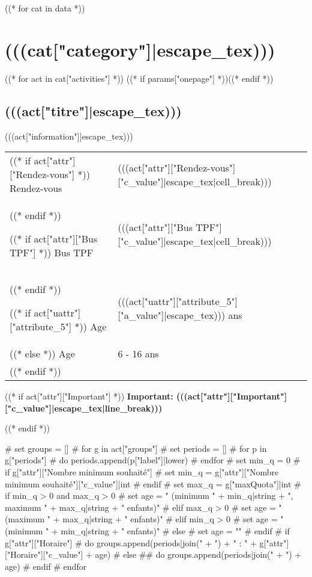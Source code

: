 ((* for cat in data *))
\chapter{(((cat["category"]|escape_tex)))}

((* for act in cat["activities"] *))
((* if params["onepage"] *))\newpage((* endif *))
\begin{minipage}[t]{\textwidth}%
\section{(((act["titre"]|escape_tex)))}

(((act["information"]|escape_tex)))
\medskip

\begin{tabulary}{0.9\textwidth}{p{2.5cm}|L}

((* if act["attr"]["Rendez-vous"] *))
Rendez-vous & (((act["attr"]["Rendez-vous"]["c_value"]|escape_tex|cell_break))) \\
((* endif *))

((* if act["attr"]["Bus TPF"] *))
Bus TPF & (((act["attr"]["Bus TPF"]["c_value"]|escape_tex|cell_break))) \\
((* endif *))

((* if act["uattr"]["attribute_5"] *))
Age & (((act["uattr"]["attribute_5"]["a_value"]|escape_tex))) ans \\
((* else *))
Age & 6 - 16 ans \\
((* endif *))

\end{tabulary}

((* if act["attr"]["Important"] *))
\medskip
\textbf{Important: (((act["attr"]["Important"]["c_value"]|escape_tex|line_break)))}

((* endif *))

# set groups = []
# for g in act["groups"]
#   set periods = []
#   for p in g["periods"]
#     do periods.append(p["label"]|lower)
#   endfor
#   set min_q = 0
#   if g["attr"]["Nombre minimum souhaité"]
#     set min_q = g["attr"]["Nombre minimum souhaité"]["c_value"]|int
#   endif
#   set max_q = g["maxQuota"]|int
#   if min_q > 0 and max_q > 0
#     set age = " (minimum " + min_q|string + ", maximum " + max_q|string + " enfants)"
#   elif max_q > 0
#     set age = " (maximum " + max_q|string + " enfants)"
#   elif min_q > 0
#     set age = " (minimum " + min_q|string + " enfants)"
#   else
#     set age = ""
#   endif
#   if g["attr"]["Horaire"]
#     do groups.append(periods|join(" + ") + " : " + g["attr"]["Horaire"]["c_value"] + age)
#   else
##    do groups.append(periods|join(" + ") + age)
#   endif
# endfor


\end{minipage}
